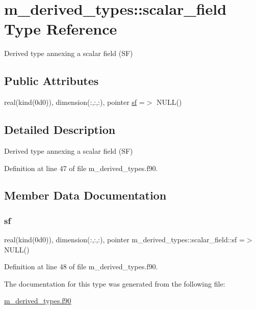 \hypertarget{structm__derived__types_1_1scalar__field}{}\section{m\+\_\+derived\+\_\+types\+:\+:scalar\+\_\+field Type Reference}
\label{structm__derived__types_1_1scalar__field}


Derived type annexing a scalar field (SF)  


\subsection*{Public Attributes}
\begin{DoxyCompactItemize}
\item 
real(kind(0d0)), dimension(\+:,\+:,\+:), pointer \hyperlink{structm__derived__types_1_1scalar__field_a81eef148a1645bae2476fffacb82d735}{sf} =$>$ N\+U\+LL()
\end{DoxyCompactItemize}


\subsection{Detailed Description}
Derived type annexing a scalar field (SF) 

Definition at line 47 of file m\+\_\+derived\+\_\+types.\+f90.



\subsection{Member Data Documentation}
\mbox{\label{structm__derived__types_1_1scalar__field_a81eef148a1645bae2476fffacb82d735}} 
\subsubsection{\texorpdfstring{sf}{sf}}
{\footnotesize\ttfamily real(kind(0d0)), dimension(\+:,\+:,\+:), pointer m\+\_\+derived\+\_\+types\+::scalar\+\_\+field\+::sf =$>$ N\+U\+LL()}



Definition at line 48 of file m\+\_\+derived\+\_\+types.\+f90.



The documentation for this type was generated from the following file\+:\begin{DoxyCompactItemize}
\item 
\hyperlink{m__derived__types_8f90}{m\+\_\+derived\+\_\+types.\+f90}\end{DoxyCompactItemize}
